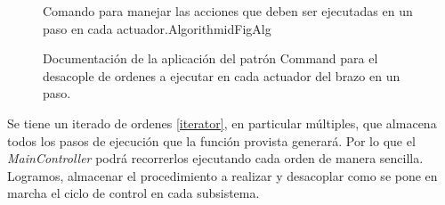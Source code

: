 \begin{figure}[h]
\caption{Documentación de la aplicación del patrón Command para el desacople de ordenes a ejecutar en cada actuador del brazo en un paso.}
\label{docCommandSteps}
\begin{pattern}[]{Comando para manejar las acciones que deben ser ejecutadas en un paso en cada actuador.}{Algorithm}{idFigAlg}
\assigns
{}

\end{pattern}
\end{figure}


Se tiene un iterado de ordenes \ref{iterator}, en particular múltiples, que almacena todos los pasos de ejecución que la función provista generará. Por lo que el \textit{MainController} podrá recorrerlos ejecutando cada orden de manera sencilla. Logramos, almacenar el procedimiento a realizar y desacoplar como se pone en marcha el ciclo de control en cada subsistema.

